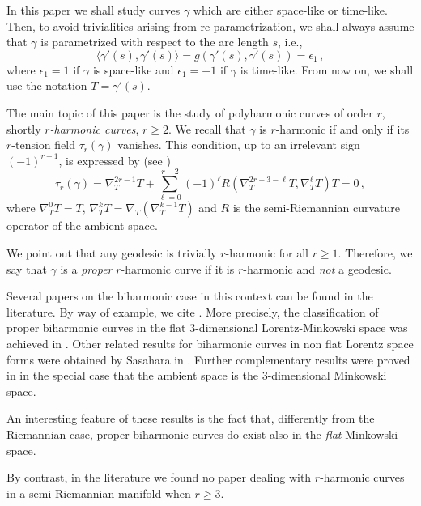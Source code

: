 \documentclass[11pt]{amsart}
\theoremstyle{plain}
\theoremstyle{definition}
\numberwithin{equation}{section}
\begin{document}
In this paper we shall study curves $\gamma$ which are either space-like or time-like. Then, to avoid trivialities arising from re-parametrization, we shall always assume that $\gamma$ is parametrized with respect to the arc length $s$, i.e.,
\[
\langle \gamma'(s),\gamma' (s)\rangle=g(\gamma'(s),\gamma' (s))=\epsilon_1\,,
\]
where $\epsilon_1=1$ if $\gamma$ is space-like and $\epsilon_1=-1$ if $\gamma$ is time-like. 
From now on, we shall use the notation $T=\gamma'(s)$. 

The main topic of this paper is the study of polyharmonic curves of order $r$, shortly \textit{$r$-harmonic curves}, $r \geq 2$. 
We recall that $\gamma$ is $r$-harmonic if and only if its $r$-tension field $\tau_r(\gamma)$ vanishes. This condition, up to an irrelevant sign $(-1)^{r-1}$, is expressed by (see \cite{MR4542687,MR2869168,MR4308322, MR1, MR2})
\begin{equation}\label{r-harmonicity-curves}
\tau_r(\gamma)=\nabla^{2r-1}_T T+ \sum_{\ell=0}^{r-2}(-1)^\ell R\left (\nabla^{2r-3-\ell}_T T ,\nabla^{\ell}_T T\right )T=0 \,,
\end{equation}
where $\nabla^{0}_T T=T,\,\nabla^{k}_T T=\nabla_T \left ( \nabla^{k-1}_T T\right ) $ and $R$ is the semi-Riemannian curvature operator of the ambient space.

We point out that any geodesic is trivially $r$-harmonic for all $r \geq 1$. Therefore, we say that $\gamma$ is a \textit{proper} $r$-harmonic curve if it is $r$-harmonic and \textit{not} a geodesic.

Several papers on the biharmonic case in this context can be found in the literature. By way of example, we cite \cite{MR1609044,Du-Zhang, MR4142001,MR4393014,MR1990566,MR2251644,MR3879834,MR4160739}. More precisely, the classification of proper biharmonic curves in the flat $3$-dimensional Lorentz-Minkowski space was achieved in \cite{Du-Zhang,MR4142001}. Other related results for biharmonic curves in non flat Lorentz space forms were obtained by Sasahara in \cite{Sasahara}. Further complementary results were proved in \cite{MR3879834,MR4160739} in the special case that the ambient space is the $3$-dimensional Minkowski space. 

An interesting feature of these results is the fact that, differently from the Riemannian case, proper biharmonic curves do exist also in the \textit{flat} Minkowski space.

By contrast, in the literature we found no paper dealing with $r$-harmonic curves in a semi-Riemannian manifold when $r \geq3$. 
\end{document}
